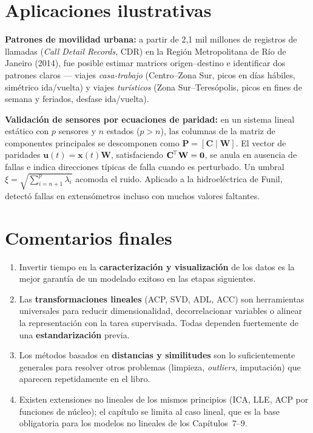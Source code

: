 \section{Aplicaciones ilustrativas}

\begin{aplicacao}
\textbf{Patrones de movilidad urbana:} a partir de 2{,}1 mil millones de
registros de llamadas (\emph{Call Detail Records}, CDR) en la Región
Metropolitana de Río de Janeiro (2014), fue posible estimar matrices
origen--destino e identificar dos patrones claros — viajes
\emph{casa-trabajo} (Centro--Zona Sur, picos en días hábiles, simétrico
ida/vuelta) y viajes \emph{turísticos} (Zona Sur--Teresópolis, picos en
fines de semana y feriados, desfase ida/vuelta).
\end{aplicacao}

\begin{aplicacao}
\textbf{Validación de sensores por ecuaciones de paridad:} en un
sistema lineal estático con $p$ sensores y $n$ estados ($p>n$), las
columnas de la matriz de componentes principales se descomponen como
$\mathbf{P}=[\mathbf{C}\mid\mathbf{W}]$. El vector de paridades
$\mathbf{u}(t)=\mathbf{x}(t)\mathbf{W}$, satisfaciendo
$\mathbf{C}^{\!\top}\mathbf{W}=\mathbf{0}$, se anula en ausencia de fallas e
indica direcciones típicas de falla cuando es perturbado. Un umbral
$\xi=\sqrt{\sum_{i=n+1}^{p}\lambda_i}$ acomoda el ruido. Aplicado a la
hidroeléctrica de Funil, detectó fallas en extensómetros incluso con
muchos valores faltantes.
\end{aplicacao}

\section{Comentarios finales}

\begin{enumerate}[leftmargin=1.2cm]
  \item Invertir tiempo en la \textbf{caracterización y visualización}
        de los datos es la mejor garantía de un modelado exitoso en las
        etapas siguientes.
  \item Las \textbf{transformaciones lineales} (ACP, SVD, ADL, ACC) son
        herramientas universales para reducir dimensionalidad,
        decorrelacionar variables o alinear la representación con la
        tarea supervisada. Todas dependen fuertemente de una
        \textbf{estandarización} previa.
  \item Los métodos basados en \textbf{distancias y similitudes} son lo
        suficientemente generales para resolver otros problemas
        (limpieza, \emph{outliers}, imputación) que aparecen
        repetidamente en el libro.
  \item Existen extensiones no lineales de los mismos principios (ICA,
        LLE, ACP por funciones de núcleo); el capítulo se limita al
        caso lineal, que es la base obligatoria para los modelos no
        lineales de los Capítulos~7--9.
\end{enumerate}


